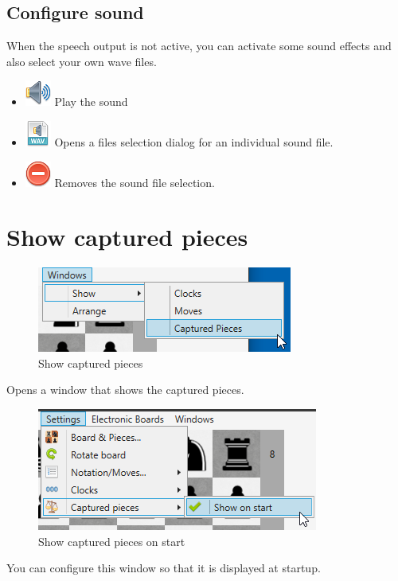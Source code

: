 \documentclass[11pt,a4paper]{article}
\begin{document}
\subsection{Configure sound}

When the speech output is not active, you can activate some sound effects and also select your own wave files.

\begin{itemize}
	\item \includegraphics[scale=0.5]{sound.png} Play the sound
	\item \includegraphics[scale=0.5]{file_extension_wav.png} Opens a files selection dialog for an individual sound file.
	\item \includegraphics[scale=0.5]{delete.png} Removes the sound file selection.
\end{itemize}


\section{Show captured pieces}
\begin{figure}[H]
	\centering
	\includegraphics[scale=1.0]{CapturedPieces1.png}
	\caption{Show captured pieces }
	\label{fig:CapturedPieces1}
\end{figure}

Opens a window that shows the captured pieces.
\begin{figure}[H]
	\centering
	\includegraphics[scale=1.0]{CapturedPieces2.png}
	\caption{Show captured pieces on start }
	\label{fig:CapturedPieces2}
\end{figure}
You can configure this window so that it is displayed at startup.
\end{document}
